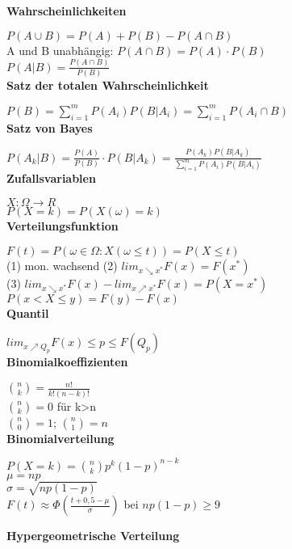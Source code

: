 \documentclass[10pt,twocolumn,a4paper]{article}
\begin{document}
\begin{flushleft}

\textbf{Wahrscheinlichkeiten}

$P(A \cup B) = P(A) + P(B) - P(A \cap B)$\\
A und B unabhängig: $P(A \cap B) = P(A) \cdot P(B)$\\
$P(A|B) = \frac{P(A \cap B)}{P(B)}$\\

\textbf{Satz der totalen Wahrscheinlichkeit}

$P(B) = \sum_{i=1}^m P(A_i) P(B|A_i) = \sum_{i=1}^m P(A_i \cap B)$\\

\textbf{Satz von Bayes}

$P(A_k|B) = \frac{P(A)}{P(B)} \cdot P(B|A_k) = \frac{P(A_k) P(B|A_k)}{\sum_{i=1}^m P(A_i) P(B|A_i)}$\\

\textbf{Zufallsvariablen}

$X: \Omega \rightarrow R$\\
$P(X=k) = P(X(\omega)=k)$\\

\textbf{Verteilungsfunktion}

$F(t) = P({\omega \in \Omega: X(\omega \leq t)}) = P(X \leq t)$\\
(1) mon. wachsend (2) $lim_{x\searrow x^*}F(x)=F(x^*)$\\
(3) $lim_{x\searrow x^*}F(x)-lim_{x\nearrow x^*}F(x)=P(X=x^*)$\\
$P(x < X \leq y) = F(y) - F(x)$\\

\textbf{Quantil}

$lim_{x\nearrow Q_p}F(x) \leq p \leq F(Q_p)$\\

\textbf{Binomialkoeffizienten}

$\binom{n}{k} = \frac{n!}{k!(n-k)!}$\\
$\binom{n}{k} = 0$ für k>n\\
$\binom{n}{0} = 1$; $\binom{n}{1} = n$\\

\textbf{Binomialverteilung}

$P(X=k) = \binom{n}{k}p^k(1-p)^{n-k}$\\
$\mu = np$\\
$\sigma = \sqrt{np(1-p)}$\\
$F(t) \approx \Phi(\frac{t+0,5-\mu}{\sigma})$ bei $np(1-p) \geq 9$

\textbf{Hypergeometrische Verteilung}


\end{flushleft}
\end{document}
